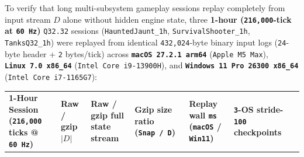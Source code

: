 \documentclass[10pt,letterpaper]{article}
\begin{document}
To verify that long multi-subsystem gameplay sessions replay completely
from input stream \(D\) alone without hidden engine state, three
\textbf{1-hour (\texttt{216,000}-tick at \texttt{60\ Hz})}
\texttt{Q32.32} sessions (\texttt{HauntedJaunt\_\allowbreak{}1h},
\texttt{SurvivalShooter\_\allowbreak{}1h}, \texttt{TanksQ32\_\allowbreak{}1h}) were replayed from
identical \texttt{432,024}-byte binary input logs (\texttt{24}-byte
header + \texttt{2} bytes/tick) across
\textbf{\texttt{macOS\ 27.\allowbreak{}2.\allowbreak{}1\ arm64}} (\texttt{Apple\ M5\ Max}),
\textbf{\texttt{Linux\ 7.\allowbreak{}0\ x86\_\allowbreak{}64}} (\texttt{Intel\ Core\ i9-\allowbreak{}13900H}),
and \textbf{\texttt{Windows\ 11\ Pro\ 26300\ x86\_\allowbreak{}64}}
(\texttt{Intel\ Core\ i7-\allowbreak{}1165G7}):

{\scriptsize\setlength{\tabcolsep}{3.0pt}\renewcommand{\arraystretch}{1.14}
\begin{longtable}[]{@{}
  >{\raggedright\arraybackslash}p{}
  >{\raggedleft\arraybackslash}p{}
  >{\raggedleft\arraybackslash}p{}
  >{\raggedleft\arraybackslash}p{}
  >{\raggedleft\arraybackslash}p{}
  >{\centering\arraybackslash}p{}
  >{\raggedright\arraybackslash}p{}@{}}
\toprule\noalign{}
\begin{minipage}[b]{\linewidth}\raggedright
\textbf{1-Hour Session (\texttt{216,000} ticks @ \texttt{60\ Hz})}
\end{minipage} & \begin{minipage}[b]{\linewidth}\raggedleft
\textbf{Raw / gzip \(\lvert D \rvert\)}
\end{minipage} & \begin{minipage}[b]{\linewidth}\raggedleft
\textbf{Raw / gzip full state stream}
\end{minipage} & \begin{minipage}[b]{\linewidth}\raggedleft
\textbf{Gzip size ratio (\texttt{Snap\ /\allowbreak{}\ D})}
\end{minipage} & \begin{minipage}[b]{\linewidth}\raggedleft
\textbf{Replay wall \texttt{ms} (\texttt{macOS} / \texttt{Win11})}
\end{minipage} & \begin{minipage}[b]{\linewidth}\centering
\textbf{\texttt{3}-OS stride-\texttt{100} checkpoints}

\end{minipage}
\end{longtable}}
\end{document}
